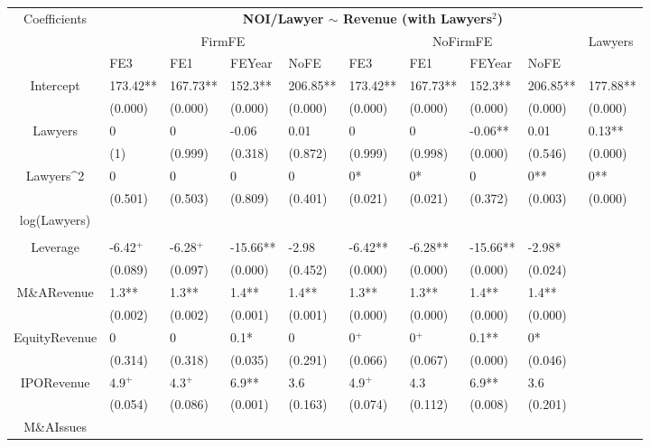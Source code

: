 \documentclass{article}
\begin{document}
\begin{table}[H]
\centering
\begin{tabular}{|clllllllll|}
\hline
\multirow{3}{*}{Coefficients} & \multicolumn{9}{c|}{\textbf{NOI/Lawyer $\sim$ Revenue (with Lawyers$^2$)}} \\
\cline{2-10}
& \multicolumn{4}{c}{FirmFE} & \multicolumn{4}{c}{NoFirmFE} & \multirow{2}{*}{Lawyers} \\
\cline{2-9}
& FE3 & FE1 & FEYear & NoFE & FE3 & FE1 & FEYear & NoFE &  \\
\hline
 
Intercept & 173.42** & 167.73** & 152.3** & 206.85** & 173.42** & 167.73** & 152.3** & 206.85** & 177.88** \\ 
   & (0.000) & (0.000) & (0.000) & (0.000) & (0.000) & (0.000) & (0.000) & (0.000) & (0.000) \\ 
  Lawyers & 0 & 0 & -0.06 & 0.01 & 0 & 0 & -0.06** & 0.01 & 0.13** \\ 
   & (1) & (0.999) & (0.318) & (0.872) & (0.999) & (0.998) & (0.000) & (0.546) & (0.000) \\ 
  Lawyers^2 & 0 & 0 & 0 & 0 & 0* & 0* & 0 & 0** & 0** \\ 
   & (0.501) & (0.503) & (0.809) & (0.401) & (0.021) & (0.021) & (0.372) & (0.003) & (0.000) \\ 
  log(Lawyers) &  &  &  &  &  &  &  &  &  \\ 
   &  &  &  &  &  &  &  &  &  \\ 
  Leverage & -6.42$^{+}$ & -6.28$^{+}$ & -15.66** & -2.98 & -6.42** & -6.28** & -15.66** & -2.98* &  \\ 
   & (0.089) & (0.097) & (0.000) & (0.452) & (0.000) & (0.000) & (0.000) & (0.024) &  \\ 
  M\&ARevenue & 1.3** & 1.3** & 1.4** & 1.4** & 1.3** & 1.3** & 1.4** & 1.4** &  \\ 
   & (0.002) & (0.002) & (0.001) & (0.001) & (0.000) & (0.000) & (0.000) & (0.000) &  \\ 
  EquityRevenue & 0 & 0 & 0.1* & 0 & 0$^{+}$ & 0$^{+}$ & 0.1** & 0* &  \\ 
   & (0.314) & (0.318) & (0.035) & (0.291) & (0.066) & (0.067) & (0.000) & (0.046) &  \\ 
  IPORevenue & 4.9$^{+}$ & 4.3$^{+}$ & 6.9** & 3.6 & 4.9$^{+}$ & 4.3 & 6.9** & 3.6 &  \\ 
   & (0.054) & (0.086) & (0.001) & (0.163) & (0.074) & (0.112) & (0.008) & (0.201) &  \\ 
  M\&AIssues &  &  &  &  &  &  &  &  &  \\ 

\end{tabular}
\end{table}
\end{document}
